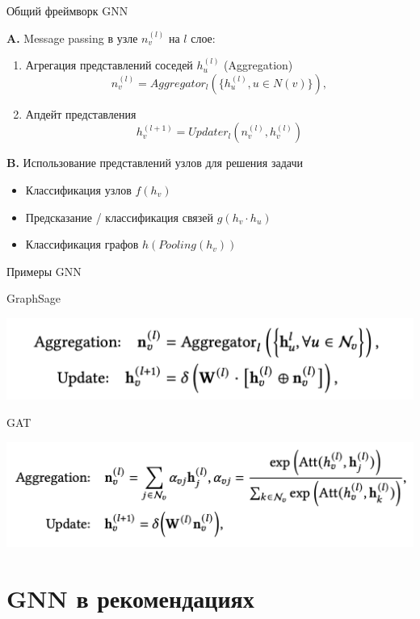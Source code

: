 \documentclass[11pt,aspectratio=169,handout]{beamer}
\begin{document}
\begin{frame}{Общий фреймворк GNN \cite{GNNSURVEY}}

{\bf A.} Message passing в узле $n_v^{(l)}$ на $l$ слое:
\begin{enumerate}
\item Агрегация представлений соседей $h_u^{(l)}$ (Aggregation)
\[
n_v^{(l)} = Aggregator_l(\{h_u^{(l)}, u \in N(v)\}), 
\]
\item Апдейт представления
\[
h_v^{(l+1)} = Updater_l(n_v^{(l)}, h_v^{(l)})
\]
\end{enumerate}

\pause

{\bf B.} Использование представлений узлов для решения задачи
\begin{itemize}
\item Классификация узлов $f(h_v)$
\item Предсказание / классификация связей $g(h_v \cdot h_u)$
\item Классификация графов $h(Pooling(h_v))$
\end{itemize}

\end{frame}

\begin{frame}{Примеры GNN}

GraphSage

\includegraphics[scale=0.4]{images/graphsage.png}

GAT

\includegraphics[scale=0.4]{images/gat.png}

\end{frame}

\section{GNN в рекомендациях}
\end{document}
